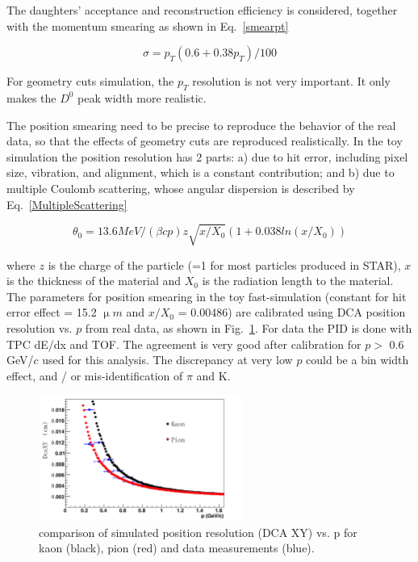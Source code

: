 \documentclass[a4paper]{article}
\begin{document}
The daughters' acceptance and reconstruction efficiency is considered, together with the momentum smearing as shown in Eq.~\ref{smearpt}

\begin{equation}
  \sigma = p_T(0.6+0.38p_T)/100
\label{smearpt}
\end{equation}

For geometry cuts simulation, the $p_T$ resolution is not very important. It only makes the $D^0$ peak width more realistic.

The position smearing need to be precise to reproduce the behavior of the real data, so that the effects of geometry cuts are reproduced realistically. In the toy simulation the position resolution has 2 parts: a) due to hit error, including pixel size, vibration, and alignment, which is a constant contribution; and b) due to multiple Coulomb scattering, whose angular dispersion is described by Eq.~\ref{MultipleScattering}

\begin{equation}
  \theta_0 = 13.6 MeV/({\beta}cp)z\sqrt{x/X_0}(1+0.038ln(x/X_0))
\label{MultipleScattering}
\end{equation}

where $z$ is the charge of the particle (=1 for most particles produced in STAR), $x$ is the thickness of the material and $X_0$ is the radiation length to the material. The parameters for position smearing in the toy fast-simulation (constant for hit error effect = 15.2 ${\upmu}m$ and $x/X_0$ = 0.00486) are calibrated using DCA position resolution vs. $p$ from real data, as shown in Fig.~\ref{fig:positionResolutionComapre}. For data the PID is done with TPC dE/dx and TOF. The agreement is very good after calibration for $p >$ 0.6 GeV/$c$ used for this analysis. The discrepancy at very low $p$ could be a bin width effect, and / or mis-identification of $\pi$ and K.  

\begin{figure}[htbp]
\centering
\includegraphics[keepaspectratio,width=0.6\textwidth,angle=0]{fig/sigmaCompare.png}
\caption{comparison of simulated position resolution (DCA XY) vs. p for kaon (black), pion (red) and data measurements (blue).}
 \label{fig:positionResolutionComapre}
\end{figure}
\end{document}
